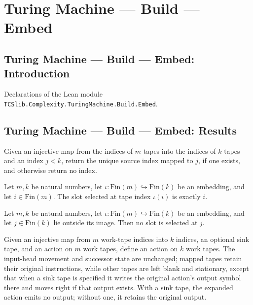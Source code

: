 \section{Turing Machine --- Build --- Embed}
\subsection*{Turing Machine --- Build --- Embed: Introduction}

Declarations of the Lean module \texttt{TCSlib.Complexity.TuringMachine.Build.Embed}.

\subsection*{Turing Machine --- Build --- Embed: Results}

\begin{definition}
\label{Turing.embedSlot}
\leanok
Given an injective map from the indices of $m$ tapes into the indices of $k$ tapes and
an index $j<k$, return the unique source index mapped to $j$, if one exists, and
otherwise return no index.
\end{definition}

\begin{lemma}
\label{Turing.embedSlot_selected}
\leanok
{}
Let $m,k$ be natural numbers, let $\iota:\mathrm{Fin}(m)\hookrightarrow\mathrm{Fin}(k)$
be an embedding, and let $i\in\mathrm{Fin}(m)$. The slot selected at tape index
$\iota(i)$ is exactly $i$.
\end{lemma}

\begin{lemma}
\label{Turing.embedSlot_unselected}
\leanok
{}
Let $m,k$ be natural numbers, let $\iota:\mathrm{Fin}(m)\hookrightarrow\mathrm{Fin}(k)$
be an embedding, and let $j\in\mathrm{Fin}(k)$ lie outside its image. Then no slot is
selected at $j$.
\end{lemma}

\begin{definition}
\label{Turing.embedActionCore}
\leanok
{}
Given an injective map from $m$ work-tape indices into $k$ indices, an optional sink
tape, and an action on $m$ work tapes, define an action on $k$ work tapes. The
input-head movement and successor state are unchanged; mapped tapes retain their
original instructions, while other tapes are left blank and stationary, except that when
a sink tape is specified it writes the original action's output symbol there and moves
right if that output exists. With a sink tape, the expanded action emits no output;
without one, it retains the original output.
\end{definition}

